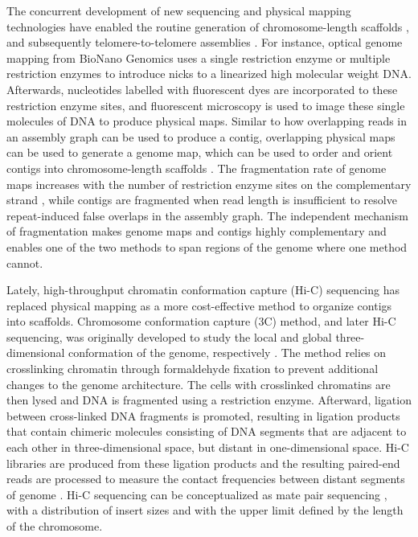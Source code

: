 The concurrent development of new sequencing and physical mapping technologies have enabled the routine generation of chromosome-length scaffolds \cite{}, and subsequently telomere-to-telomere assemblies \cite{}. For instance, optical genome mapping from BioNano Genomics uses a single restriction enzyme or multiple restriction enzymes to introduce nicks to a linearized high molecular weight DNA. Afterwards, nucleotides labelled with fluorescent dyes are incorporated to these restriction enzyme sites, and fluorescent microscopy is used to image these single molecules of DNA to produce physical maps. Similar to how overlapping reads in an assembly graph can be used to produce a contig, overlapping physical maps can be used to generate a genome map, which can be used to order and orient contigs into chromosome-length scaffolds \cite{}. The fragmentation rate of genome maps increases with the number of restriction enzyme sites on the complementary strand \cite{}, while contigs are fragmented when read length is insufficient to resolve repeat-induced false overlaps in the assembly graph. The independent mechanism of fragmentation makes genome maps and contigs highly complementary and enables one of the two methods to span regions of the genome where one method cannot. 

Lately, high-throughput chromatin conformation capture (Hi-C) sequencing has replaced physical mapping as a more cost-effective method to organize contigs into scaffolds. Chromosome conformation capture (3C) method, and later Hi-C sequencing, was originally developed to study the local and global three-dimensional conformation of the genome, respectively \cite{}. The method relies on crosslinking chromatin through formaldehyde fixation to prevent additional changes to the genome architecture. The cells with crosslinked chromatins are then lysed and DNA is fragmented using a restriction enzyme. Afterward, ligation between cross-linked DNA fragments is promoted, resulting in ligation products that contain chimeric molecules consisting of DNA segments that are adjacent to each other in three-dimensional space, but distant in one-dimensional space. Hi-C libraries are produced from these ligation products and the resulting paired-end reads are processed to measure the contact frequencies between distant segments of genome \cite{}. Hi-C sequencing can be conceptualized as mate pair sequencing \cite{}, with a distribution of insert sizes and with the upper limit defined by the length of the chromosome. 

